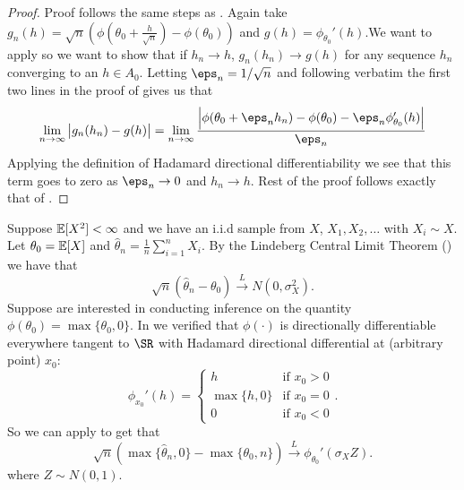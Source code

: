 \begin{proof}
	Proof follows the same steps as . Again take \(g_n(h) = \sqrt{n}\left(\phi(\theta_0 + \frac{h}{\sqrt{n}})-\phi(\theta_0)\right)\) and \(g(h) = \phi_{\theta_0}'(h)\).We want to apply  so we want to show that if \(h_n \to h \), \(g_n(h_n)\to g(h)\) for any sequence \(h_n\) converging to an \(h \in A_0\). Letting \(\eps_n=1/\sqrt{n}\) and following verbatim the first two lines in the proof of  gives us that
	\begin{align*}
	\lim_{n\to\infty}\left|g_n(h_n)-g(h)\right| = \lim_{n\to \infty}\frac{\left|\phi(\theta_0+\eps_nh_n)-\phi(\theta_0)-\eps_n\phi_{\theta_0}'(h)\right|}{\eps_n} 
	\end{align*}
	Applying the definition of Hadamard directional differentiability we see that this term goes to zero as \(\eps_n\to 0\) and \(h_n\to h\). Rest of the proof follows exactly that of .
\end{proof}
\begin{example}
	Suppose \(\mathbb{E}[X^2] < \infty\) and we have an i.i.d sample from \(X\), \(X_1,X_2,\dots\) with \(X_i\sim X\). Let \(\theta_0 = \mathbb{E}[X]\) and \(\hat \theta_n = \frac{1}{n}\sum_{i=1}^n X_i\). By the Lindeberg Central Limit Theorem () we have that
	\[
		\sqrt{n}\left(\hat\theta_n-\theta_0\right)\overset{L}{\to} N(0,\sigma_X^2)
	.\] 
	Suppose are interested in conducting inference on the quantity \(\phi(\theta_0) = \max\{\theta_0,0\}\). In  we verified that \(\phi(\cdot)\) is directionally differentiable everywhere tangent to \(\SR\) with Hadamard directional differential at (arbitrary point) \(x_0\):
	\[
		\phi_{x_0}'(h) = \begin{cases}
			h & \text{if }x_0 > 0 \\
			\max\{h,0\} & \text{if }x_0=0\\
			0 &\text{if }x_0 < 0
		\end{cases}
	.\] 
	So we can apply  to get that
	\[
		\sqrt{n}\left(\max\{\hat\theta_n,0\} - \max\{\theta_0,n\}  \right)\overset{L}{\to} \phi_{\theta_0}'\left(\sigma_X Z\right)
	.\] 
	where \(Z\sim N(0,1)\).
\end{example}


